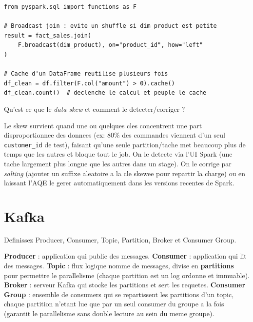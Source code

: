 \documentclass[11pt,a4paper]{article}
\begin{document}
\begin{lstlisting}
from pyspark.sql import functions as F

# Broadcast join : evite un shuffle si dim_product est petite
result = fact_sales.join(
    F.broadcast(dim_product), on="product_id", how="left"
)

# Cache d'un DataFrame reutilise plusieurs fois
df_clean = df.filter(F.col("amount") > 0).cache()
df_clean.count()  # declenche le calcul et peuple le cache
\end{lstlisting}

\begin{question} Qu'est-ce que le \emph{data skew} et comment le detecter/corriger ?
\end{question}
\begin{reponse}
Le skew survient quand une ou quelques cles concentrent une part disproportionnee des donnees (ex: 80\% des commandes viennent d'un seul \texttt{customer\_id} de test), faisant qu'une seule partition/tache met beaucoup plus de temps que les autres et bloque tout le job. On le detecte via l'UI Spark (une tache largement plus longue que les autres dans un stage). On le corrige par \emph{salting} (ajouter un suffixe aleatoire a la cle skewee pour repartir la charge) ou en laissant l'AQE le gerer automatiquement dans les versions recentes de Spark.
\end{reponse}

\newpage
\section{Kafka}

\begin{question} Definissez Producer, Consumer, Topic, Partition, Broker et Consumer Group.
\end{question}
\begin{reponse}
\textbf{Producer} : application qui publie des messages. \textbf{Consumer} : application qui lit des messages. \textbf{Topic} : flux logique nomme de messages, divise en \textbf{partitions} pour permettre le parallelisme (chaque partition est un log ordonne et immuable). \textbf{Broker} : serveur Kafka qui stocke les partitions et sert les requetes. \textbf{Consumer Group} : ensemble de consumers qui se repartissent les partitions d'un topic, chaque partition n'etant lue que par un seul consumer du groupe a la fois (garantit le parallelisme sans double lecture au sein du meme groupe).
\end{reponse}
\end{document}

